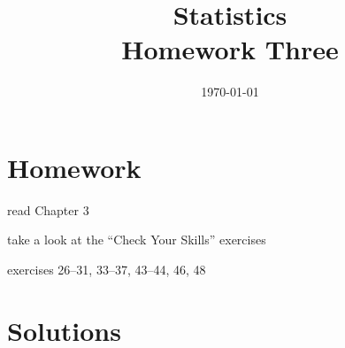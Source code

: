 \documentclass[letterpaper, landscape]{exam}
\title{Statistics \\ Homework Three}
\date{\today}
\author{}
\begin{document}
  \maketitle

  \section{Homework}
    \begin{itemize*}
      \item read Chapter 3 
      \item take a look at the ``Check Your Skills'' exercises
      \item exercises 26--31, 33--37, 43--44, 46, 48
    \end{itemize*}

    \ifprintanswers{}
  \section{Solutions}
\end{document}
